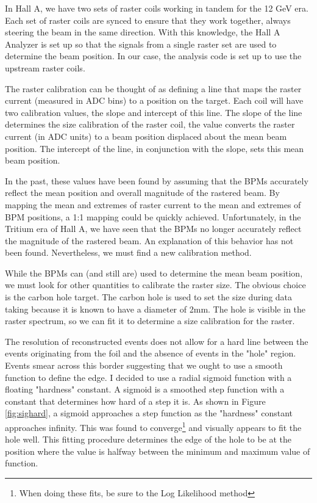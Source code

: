 In Hall A, we have two sets of raster coils working in tandem for the 12 GeV era. Each set of raster coils are synced to ensure that they work together, always steering the beam in the same direction. With this knowledge, the Hall A Analyzer is set up so that the signals from a single raster set are used to determine the beam position. In our case, the analysis code is set up to use the upstream raster coils.

The raster calibration can be thought of as defining a line that maps the raster current (measured in ADC bins) to a position on the target. Each coil will have two calibration values, the slope and intercept of this line. The slope of the line determines the size calibration of the raster coil, the value converts the raster current (in ADC units) to a beam position displaced about the mean beam position. The intercept of the line, in conjunction with the slope, sets this mean beam position.

In the past, these values have been found by assuming that the BPMs accurately reflect the mean position and overall magnitude of the rastered beam. By mapping the mean and extremes of raster current to the mean and extremes of BPM positions, a 1:1 mapping could be quickly achieved. Unfortunately, in the Tritium era of Hall A, we have seen that the BPMs no longer accurately reflect the magnitude of the rastered beam. An explanation of this behavior has not been found. Nevertheless, we must find a new calibration method.

While the BPMs can (and still are) used to determine the mean beam position, we must look for other quantities to calibrate the raster size. The obvious choice is the carbon hole target. The carbon hole is used to set the size during data taking because it is known to have a diameter of 2mm. The hole is visible in the raster spectrum, so we can fit it to determine a size calibration for the raster.

The resolution of reconstructed events does not allow for a hard line between the events originating from the foil and the absence of events in the "hole" region. Events smear across this border suggesting that we ought to use a smooth function to define the edge. I decided to use a radial sigmoid function with a floating "hardness" constant. A sigmoid is a smoothed step function with a constant that determines how hard of a step it is. As shown in Figure \ref{fig:sighard}, a sigmoid approaches a step function as the "hardness" constant approaches infinity. This was found to converge\footnote{When doing these fits, be sure to the Log Likelihood method} and visually appears to fit the hole well. This fitting procedure determines the edge of the hole to be at the position where the value is halfway between the minimum and maximum value of function.

